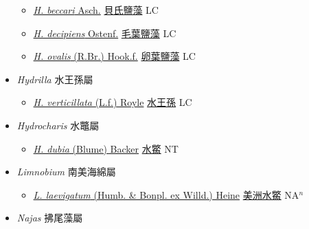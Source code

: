 \begin{itemize}
  \begin{itemize}
        \item[] \href{http://www.theplantlist.org/tpl1.1/search?q=Halophila+beccari}{\textit{H. beccari} Asch.}   \href{\detokenize{http://taibnet.sinica.edu.tw/chi/taibnet_species_list.php?T2=貝氏鹽藻&T2_new_value=true&fr=y}}{貝氏鹽藻} LC
        \item[] \href{http://www.theplantlist.org/tpl1.1/search?q=Halophila+decipiens}{\textit{H. decipiens} Ostenf.}   \href{\detokenize{http://taibnet.sinica.edu.tw/chi/taibnet_species_list.php?T2=毛葉鹽藻&T2_new_value=true&fr=y}}{毛葉鹽藻} LC
        \item[] \href{http://www.theplantlist.org/tpl1.1/search?q=Halophila+ovalis}{\textit{H. ovalis} (R.Br.) Hook.f.}   \href{\detokenize{http://taibnet.sinica.edu.tw/chi/taibnet_species_list.php?T2=卵葉鹽藻&T2_new_value=true&fr=y}}{卵葉鹽藻} LC
  \end{itemize}
 \item[] \textit{Hydrilla} 水王孫屬
                    
  \begin{itemize}
        \item[] \href{http://www.theplantlist.org/tpl1.1/search?q=Hydrilla+verticillata}{\textit{H. verticillata} (L.f.) Royle}   \href{\detokenize{http://taibnet.sinica.edu.tw/chi/taibnet_species_list.php?T2=水王孫&T2_new_value=true&fr=y}}{水王孫} LC
  \end{itemize}
 \item[] \textit{Hydrocharis} 水鼈屬
                    
  \begin{itemize}
        \item[] \href{http://www.theplantlist.org/tpl1.1/search?q=Hydrocharis+dubia}{\textit{H. dubia} (Blume) Backer}   \href{\detokenize{http://taibnet.sinica.edu.tw/chi/taibnet_species_list.php?T2=水鱉&T2_new_value=true&fr=y}}{水鱉} NT
  \end{itemize}
 \item[] \textit{Limnobium} 南美海綿屬
                    
  \begin{itemize}
        \item[] \href{http://www.theplantlist.org/tpl1.1/search?q=Limnobium+laevigatum}{\textit{L. laevigatum} (Humb. \& Bonpl. ex Willd.) Heine}   \href{\detokenize{http://taibnet.sinica.edu.tw/chi/taibnet_species_list.php?T2=美洲水鱉&T2_new_value=true&fr=y}}{美洲水鱉} NA$^n$
  \end{itemize}
 \item[] \textit{Najas} 拂尾藻屬
                    

\end{itemize}
